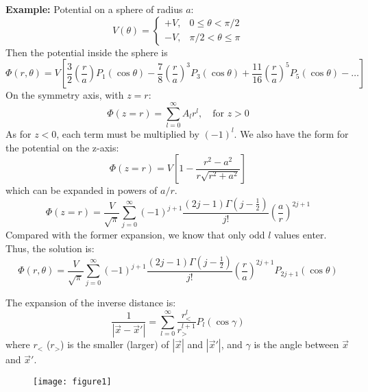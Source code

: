 \documentclass{article}
\begin{document}
	\textbf{Example:}
	Potential on a sphere of radius $a$:
	\begin{equation}
		V(\theta) = \begin{cases} +V, & 0 \le \theta < \pi/2 \\ -V, & \pi/2 < \theta \le \pi \end{cases}
	\end{equation}
	Then the potential inside the sphere is
	\begin{equation}
		\Phi(r,\theta) = V \left[ \frac{3}{2}\left(\frac{r}{a}\right)P_1(\cos\theta) - \frac{7}{8}\left(\frac{r}{a}\right)^3 P_3(\cos\theta) + \frac{11}{16}\left(\frac{r}{a}\right)^5 P_5(\cos\theta) - \dots \right]
	\end{equation}
	On the symmetry axis, with $z=r$:
	\begin{equation}
		\Phi(z=r) = \sum_{l=0}^{\infty} A_l r^l, \quad \text{for } z>0
	\end{equation}
	As for $z<0$, each term must be multiplied by $(-1)^l$.
	We also have the form for the potential on the z-axis:
	\begin{equation}
		\Phi(z=r) = V \left[ 1 - \frac{r^2 - a^2}{r\sqrt{r^2+a^2}} \right]
	\end{equation}
	which can be expanded in powers of $a/r$.
	\begin{equation}
		\Phi(z=r) = \frac{V}{\sqrt{\pi}} \sum_{j=0}^{\infty} (-1)^{j+1} \frac{(2j-1)\Gamma(j-\frac{1}{2})}{j!} \left(\frac{a}{r}\right)^{2j+1}
	\end{equation}
	Compared with the former expansion, we know that only odd $l$ values enter. Thus, the solution is:
	\begin{equation}
		\Phi(r, \theta) = \frac{V}{\sqrt{\pi}} \sum_{j=0}^{\infty} (-1)^{j+1} \frac{(2j-1)\Gamma(j-\frac{1}{2})}{j!} \left(\frac{r}{a}\right)^{2j+1} P_{2j+1}(\cos\theta)
	\end{equation}
	
	The expansion of the inverse distance is:
	\begin{equation}
		\frac{1}{|\vec{x}-\vec{x}'|} = \sum_{l=0}^{\infty} \frac{r_<^l}{r_>^{l+1}} P_l(\cos\gamma)
	\end{equation}
	where $r_<$ ($r_>$) is the smaller (larger) of $|\vec{x}|$ and $|\vec{x}'|$, and $\gamma$ is the angle between $\vec{x}$ and $\vec{x}'$.
	
	\begin{figure}[h]
		\centering
		\texttt{[image: figure1]}
		\caption{}
		\label{fig:figure1}
	\end{figure}
	
\end{document}

